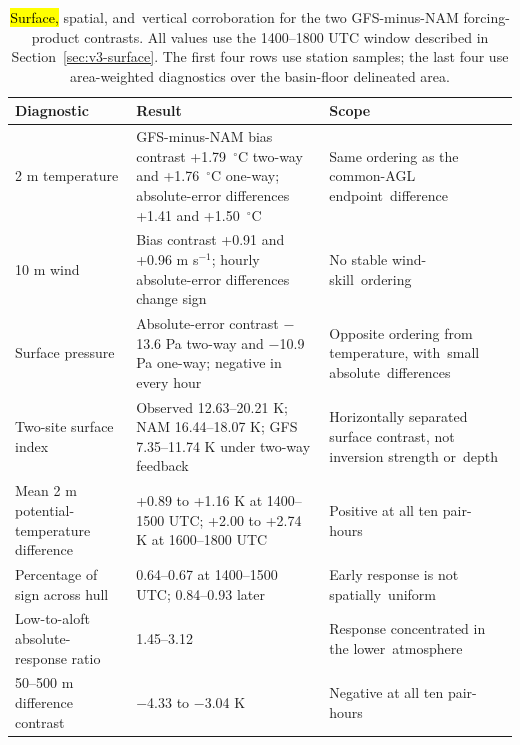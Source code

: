 \documentclass[air,article,accept,moreauthors]{Definitions/mdpi}
\begin{document}
\vspace{-9pt}
\begin{table}[H]
\caption{\hl{Surface,} %
 spatial, and~vertical corroboration for the two GFS-minus-NAM forcing-product contrasts.
All values use the 1400--1800 UTC window described in Section~\ref{sec:v3-surface}.
The first four rows use station samples; the last four use area-weighted diagnostics over the basin-floor delineated area.}
\label{tab:v3-surface-summary}

\footnotesize
\begin{tabularx}{\textwidth}{m{3.5cm}<{\raggedright}m{4.8cm}<{\raggedright}m{4cm}<{\raggedright}}
\toprule
\textbf{Diagnostic} & \textbf{Result} & \textbf{Scope} \\
\midrule
2 m temperature & GFS-minus-NAM bias contrast +1.79~$^{\circ}$C two-way and +1.76~$^{\circ}$C one-way; absolute-error differences +1.41 and +1.50~$^{\circ}$C & Same ordering as the common-AGL endpoint~difference \\
\midrule
10 m wind & Bias contrast +0.91 and +0.96 m s$^{-1}$; hourly absolute-error differences change sign & No stable wind-skill~ordering \\
\midrule
Surface pressure & Absolute-error contrast $-$13.6 Pa two-way and $-$10.9 Pa one-way; negative in every hour & Opposite ordering from temperature, with~small absolute~differences \\
\midrule
Two-site surface index & Observed 12.63--20.21 K; NAM 16.44--18.07 K; GFS 7.35--11.74 K under two-way feedback & Horizontally separated surface contrast, not inversion strength or~depth \\
\midrule
Mean 2 m potential-temperature difference & +0.89 to +1.16 K at 1400--1500 UTC; +2.00 to +2.74 K at 1600--1800 UTC & Positive at all ten pair-hours \\
\midrule
Percentage of sign across hull & 0.64--0.67 at 1400--1500 UTC; 0.84--0.93 later & Early response is not spatially~uniform \\
\midrule
Low-to-aloft absolute-response ratio & 1.45--3.12 & Response concentrated in the lower~atmosphere \\
\midrule
50--500 m difference contrast & $-$4.33 to $-$3.04 K & Negative at all ten pair-hours \\
\bottomrule
\end{tabularx}
\end{table}
\end{document}
